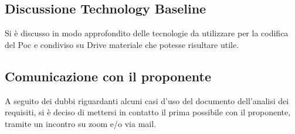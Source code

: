\subsection*{Discussione Technology Baseline}
Si è discusso in modo approfondito delle tecnologie da utilizzare per la codifica del Poc e condiviso su Drive materiale che potesse risultare utile.

\subsection*{Comunicazione con il proponente}
A seguito dei dubbi riguardanti alcuni casi d'uso del documento dell'analisi dei requisiti, si è deciso di mettersi in contatto il prima possibile con il proponente, tramite un incontro su zoom e/o via mail.